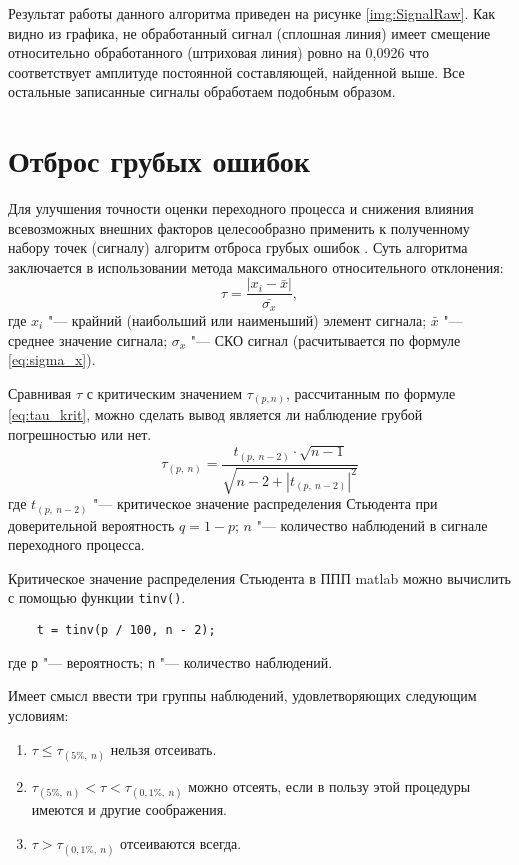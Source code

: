 Результат работы данного алгоритма приведен на рисунке \ref{img:SignalRaw}. Как видно из графика, не обработанный сигнал (сплошная линия) имеет смещение относительно обработанного (штриховая линия) ровно на 0,0926 что соответствует амплитуде постоянной составляющей, найденной выше. Все остальные записанные сигналы обработаем подобным образом.

\section{Отброс грубых ошибок}\label{sect3_2}

Для улучшения точности оценки переходного процесса и снижения влияния всевозможных внешних факторов целесообразно применить к полученному набору точек (сигналу) алгоритм отброса грубых ошибок \cite{LvovStat}. Суть алгоритма заключается в использовании метода максимального относительного отклонения:
\begin{equation}\label{eq:MOO}
	\tau=\frac{|x_i-\bar{x}|}{\bar{\sigma_x}},
\end{equation} 
где $ x_i $ "--- крайний (наибольший или наименьший) элемент сигнала; $ \bar{x} $ "--- среднее значение сигнала; $ \sigma_x $ "--- СКО сигнал (расчитывается по формуле \ref{eq:sigma_x}).

Сравнивая $ \tau $ с критическим значением $ \tau_{(p,n)} $, рассчитанным по формуле \ref{eq:tau_krit}, можно сделать вывод является ли наблюдение грубой погрешностью или нет.
\begin{equation}\label{eq:tau_krit}
	\tau_{(p,\ n)}=\frac{t_{(p,\ n-2)}\cdot\sqrt{n-1}}{\sqrt{n-2+|t_{(p,\ n-2)}|^2}}
\end{equation}
где $ t_{(p,\ n-2)} $ "--- критическое значение распределения Стьюдента при доверительной вероятность $ q=1-p $; $ n $ "--- количество наблюдений в сигнале переходного процесса.

Критическое значение распределения Стьюдента в ППП matlab можно вычислить с помощью функции \lstinline{tinv()}. 
\begin{lstlisting}
	t = tinv(p / 100, n - 2);
\end{lstlisting}
где \lstinline{p} "--- вероятность; \lstinline{n} "--- количество наблюдений.

Имеет смысл ввести три группы наблюдений, удовлетворяющих следующим условиям:
\begin{enumerate}
	\item $ \tau \leqslant \tau_{(5\%,\ n)} $ нельзя отсеивать.
	\item $ \tau_{(5\%,\ n)} < \tau < \tau_{(0,1\%,\ n)} $ можно отсеять, если в пользу этой процедуры имеются и другие соображения.
	\item $ \tau > \tau_{(0,1\%,\ n)} $ отсеиваются всегда.
\end{enumerate}

